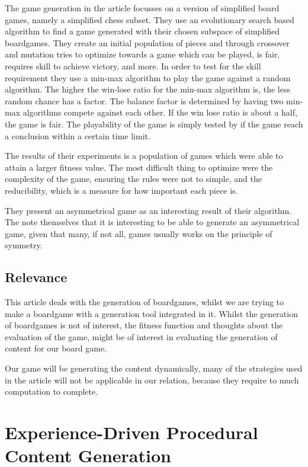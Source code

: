 \documentclass[a4paper,11pt]{article}
\begin{document}
The game generation in the article focusses on a version of simplified board games, namely a simplified chess subset. 
They use an evolutionary search based algorithm to find a game generated with their chosen subspace of simplified boardgames. They create an initial population of pieces and through crossover and mutation tries to optimize towards a game which can be played, is fair, requires skill to achieve victory, and more.
In order to test for the skill requirement they use a min-max algorithm to play the game against a random algorithm. The higher the win-lose ratio for the min-max algorithm is, the less random chance has a factor. 
The balance factor is determined by having two min-max algorithms compete against each other. If the win lose ratio is about a half, the game is fair. 
The playability of the game is simply tested by if the game reach a conclusion within a certain time limit. 

The results of their experiments is a population of games which were able to attain a larger fitness value. The most difficult thing to optimize were the complexity of the game, ensuring the rules were not to simple, and the 	reducibility, which is a measure for how important each piece is. 

They present an asymmetrical game as an interesting result of their algorithm. The note themselves that it is interesting to be able to generate an asymmetrical game, given that many, if not all, games usually works on the principle of symmetry. 

\subsection{Relevance}
This article deals with the generation of boardgames, whilst we are trying to make a boardgame with a generation tool integrated in it. 
Whilst the generation of boardgames is not of interest, the fitness function and thoughts about the evaluation of the game, might be of interest in evaluating the generation of content for our board game.

Our game will be generating the content dynamically, many of the strategies used in the article will not be applicable in our relation, because they require to much computation to complete. 

\pagebreak

\section{Experience-Driven Procedural Content Generation}
\end{document}
